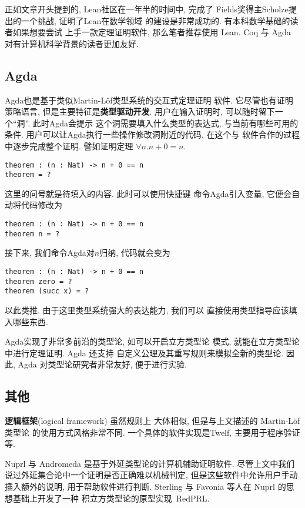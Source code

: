 正如文章开头提到的, Lean社区在一年半的时间中, 完成了
Fields奖得主Scholze提出的一个挑战, 证明了Lean在数学领域
的建设是非常成功的. 有本科数学基础的读者如果想要尝试
上手一款定理证明软件, 那么笔者推荐使用 Lean. Coq 与 Agda
对有计算机科学背景的读者更加友好.

\subsection{Agda}

Agda也是基于类似Martin-L\"of类型系统的交互式定理证明
软件. 它尽管也有证明策略语言, 但是主要特征是\textbf{类型驱动开发}.
用户在输入证明时, 可以随时留下一个“洞”. 此时Agda会提示
这个洞需要填入什么类型的表达式, 与当前有哪些可用的条件.
用户可以让Agda执行一些操作修改洞附近的代码, 在这个与
软件合作的过程中逐步完成整个证明. 譬如证明定理
\(\forall n. n + 0 = n\).
\begin{verbatim}
theorem : (n : Nat) -> n + 0 == n
theorem = ?
\end{verbatim}
这里的问号就是待填入的内容. 此时可以使用快捷键
命令Agda引入变量, 它便会自动将代码修改为
\begin{verbatim}
theorem : (n : Nat) -> n + 0 == n
theorem n = ?
\end{verbatim}
接下来, 我们命令Agda对\(n\)归纳, 代码就会变为
\begin{verbatim}
theorem : (n : Nat) -> n + 0 == n
theorem zero = ?
theorem (succ x) = ?
\end{verbatim}
以此类推. 由于这里类型系统强大的表达能力, 我们可以
直接使用类型指导应该填入哪些东西.

Agda实现了非常多前沿的类型论, 如可以开启立方类型论
模式, 就能在立方类型论中进行定理证明. Agda 还支持
自定义公理及其重写规则来模拟全新的类型论. 因此,
Agda 对类型论研究者非常友好, 便于进行实验.

\subsection{其他}

\textbf{逻辑框架}(logical framework) 虽然规则上
大体相似, 但是与上文描述的 Martin-L\"of 类型论
的使用方式风格非常不同. 一个具体的软件实现是Twelf,
主要用于程序验证等.

Nuprl 与 Andromeda 是基于外延类型论的计算机辅助证明软件.
尽管上文中我们说过外延集合论中一个证明是否正确难以机械判定,
但是这些软件中允许用户手动插入额外的说明, 用于帮助软件进行判断.
Sterling 与 Favonia 等人在 Nuprl 的思想基础上开发了一种
积立方类型论的原型实现~{\color{red}Red}PRL.
